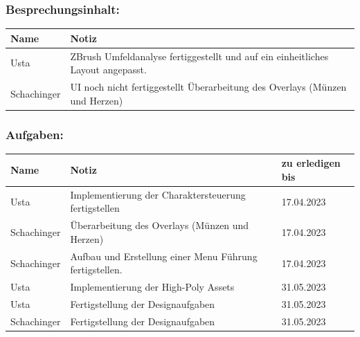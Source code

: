 \subsubsection*{Besprechungsinhalt:}
\begin{tabular}{|m{}|m{}|}
\hline
Name & Notiz \\
\hline
Usta & ZBrush Umfeldanalyse fertiggestellt und auf ein einheitliches Layout angepasst. \\
\hline
Schachinger & UI noch nicht fertiggestellt Überarbeitung des Overlays (Münzen und Herzen) \\
\hline
\end{tabular}

\subsubsection*{Aufgaben:}
\begin{tabular}{|m{}|m{}|m{}|}
\hline
Name & Notiz & zu erledigen bis \\
\hline
Usta & Implementierung der Charaktersteuerung fertigstellen & 17.04.2023 \\
\hline
Schachinger & Überarbeitung des Overlays (Münzen und Herzen) & 17.04.2023 \\
\hline
Schachinger & Aufbau und Erstellung einer Menu Führung fertigstellen. & 17.04.2023 \\
\hline
Usta & Implementierung der High-Poly Assets & 31.05.2023 \\
\hline
Usta & Fertigstellung der Designaufgaben & 31.05.2023 \\
\hline
Schachinger & Fertigstellung der Designaufgaben & 31.05.2023 \\
\hline
\end{tabular}


\pagebreak

